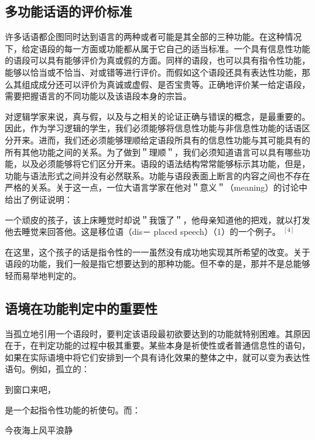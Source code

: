 \subsection{多功能话语的评价标准}

许多话语都企图同时达到语言的两种或者可能是其全部的三种功能。在这种情况下，给定语段的每一方面或功能都从属于它自己的适当标准。一个具有信息性功能的语段可以具有能够评价为真或假的方面。同样的语段，也可以具有指令性功能，能够以恰当或不恰当、对或错等进行评价。而假如这个语段还具有表达性功能，那么其组成成分还可以评价为真诚或虚假、是否宝贵等。正确地评价某一给定语段，需要把握语言的不同功能以及该语段本身的宗旨。

对逻辑学家来说，真与假，以及与之相关的论证正确与错误的概念，是最重要的。因此，作为学习逻辑的学生，我们必须能够将信息性功能与非信息性功能的话语区分开来。进而，我们还必须能够理顺给定语段所具有的信息性功能与其可能具有的所有其他功能之间的关系。为了做到＂理顺＂，我们必须知道语言可以具有哪些功能，以及必须能够将它们区分开来。语段的语法结构常常能够标示其功能，但是，功能与语法形式之间并没有必然联系。功能与语段表面上断言的内容之间也不存在严格的关系。关于这一点，一位大语言学家在他对＂意义＂（meaning）的讨论中给出了例证说明：

\begin{displayquote}
一个顽皮的孩子，该上床睡觉时却说＂我饿了＂，他母亲知道他的把戏，就以打发他去睡觉来回答他。这是移位语（dis－ placed speech）（1）的一个例子。 ${ }^{[4]}$
\end{displayquote}

在这里，这个孩子的话是指令性的一一虽然没有成功地实现其所希望的改变。关于语段的功能，我们一般是指它想要达到的那种功能。但不幸的是，那并不是总能够轻而易举地判定的。


\subsection{语境在功能判定中的重要性}

当孤立地引用一个语段时，要判定该语段最初欲要达到的功能就特别困难。其原因在于，在判定功能的过程中极其重要。某些本身是祈使性或者普通信息性的语句，如果在实际语境中将它们安排到一个具有诗化效果的整体之中，就可以变为表达性语句。例如，孤立的：

到窗口来吧，

是一个起指令性功能的祈使句。而：

今夜海上风平浪静

